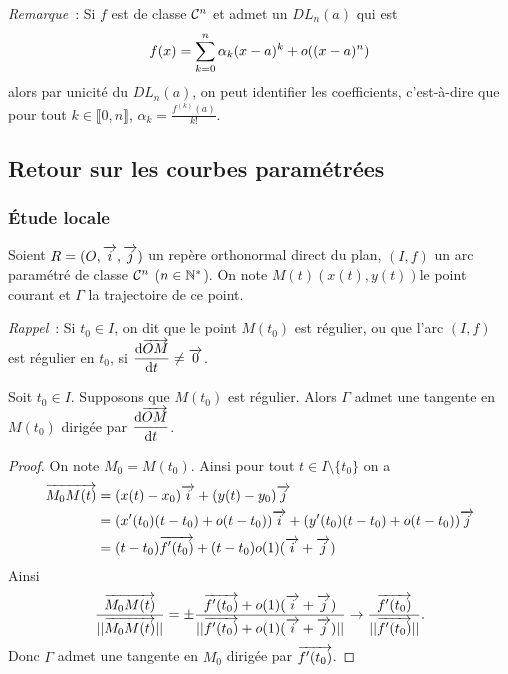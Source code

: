 \emph{Remarque}~: Si \(f\) est de classe \(\mathcal{C}^{n}\) et admet un \(DL_n(a)\)  
qui est
\begin{equation}
  f(x) = \sum_{k = 0}^n \alpha_k(x-a)^k +o\mathopen{}\left((x-a)^n\right)
\end{equation}
alors par unicité du \(DL_n(a)\), on peut identifier les coefficients, 
c'est-à-dire que pour tout \(k \in \llbracket 0,n \rrbracket\), \(\alpha_k = 
\frac{f^{(k)}(a)}{k!}\).

\subsection{Retour sur les courbes paramétrées}

\subsubsection{Étude locale}

Soient \(R = (O,\overrightarrow{i},\overrightarrow{j})\) un repère orthonormal direct du plan, \((I,f)\) un arc 
paramétré de classe \(\mathcal{C}^{n}\) (\(n \in \mathbb{N}^*\)). On note 
\(M(t)(x(t),y(t))\)le point courant et \(\Gamma\) la trajectoire de ce point.

\emph{Rappel}~: Si \(t_0 \in I\), on dit que le point \(M(t_0)\) est régulier, 
ou que l'arc \((I,f)\) est régulier en \(t_0\), si \(\dfrac{\mathrm{d} \overrightarrow{OM}}{\mathrm{d} t} \neq 
\overrightarrow{0}\).

\begin{prop}
  Soit \(t_0 \in I\). Supposons que \(M(t_0)\) est régulier. Alors \(\Gamma\) 
  admet une tangente en \(M(t_0)\) dirigée par \(\dfrac{\mathrm{d} \overrightarrow{OM}}{\mathrm{d} t}\).
\end{prop}
\begin{proof}
  On note \(M_0 = M(t_0)\). Ainsi pour tout \(t \in I\setminus\{t_0\}\) on a
  \begin{align*}
    \overrightarrow{M_0M(t)} &= (x(t)-x_0)\overrightarrow{i} + (y(t)-y_0)\overrightarrow{j} \\
    &= (x'(t_0)(t-t_0) +o(t-t_0))\overrightarrow{i} + (y'(t_0)(t-t_0) +o(t-t_0))\overrightarrow{j}\\
    & = (t-t_0)\overrightarrow{f'(t_0)} +(t-t_0)o(1)(\overrightarrow{i}+\overrightarrow{j})
  \end{align*}
  Ainsi
  \begin{equation}
    \frac{\overrightarrow{M_0M(t)}}{||\overrightarrow{M_0M(t)}||} = \pm \frac{\overrightarrow{f'(t_0)} 
    +o(1)(\overrightarrow{i}+\overrightarrow{j})}{||\overrightarrow{f'(t_0)} +o(1)(\overrightarrow{i}+\overrightarrow{j})||} \to 
    \frac{\overrightarrow{f'(t_0)}}{||\overrightarrow{f'(t_0)}||}.
  \end{equation}
  Donc \(\Gamma\) admet une tangente en \(M_0\) dirigée par \(\overrightarrow{f'(t_0)}\).
\end{proof}

